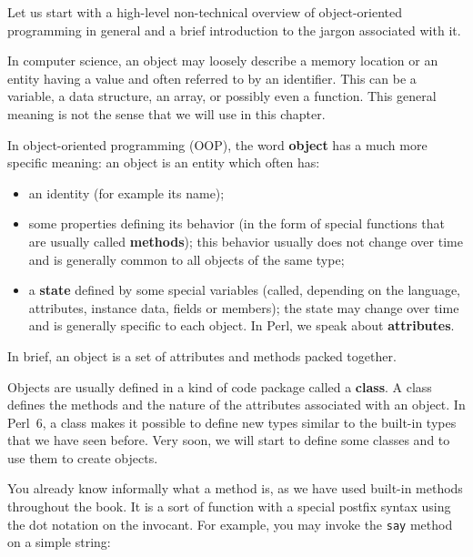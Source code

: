 Let us start with a high-level non-technical overview 
of object-oriented programming in general and a brief 
introduction to the jargon associated with it.

In computer science, an object may loosely describe a memory 
location or an entity having a value and often referred to 
by an identifier. This can be a variable, a data structure, 
an array, or possibly even a function. This general meaning 
is not the sense that we will use in this chapter.

In object-oriented programming (OOP), the word {\bf object} 
has a much more specific meaning: an object is an entity 
which often has:
\begin{itemize}

\item an identity (for example its name);

\item some properties defining its behavior (in the form of 
special functions that are usually called {\bf methods}); this 
behavior usually does not change over time and is generally 
common to all objects of the same type;

\item a {\bf state} defined by some special variables (called, 
depending on the language, attributes, instance data, fields 
or members); the state may change over time and is generally 
specific to each object. In Perl, we speak about 
{\bf attributes}.
\end{itemize}

In brief, an object is a set of attributes and methods packed 
together.

Objects are usually defined in a kind of code package called 
a {\bf class}. A class defines the methods and the nature of 
the attributes associated with an object. In Perl~6, a class makes it 
possible to define new types similar to the built-in types 
that we have seen before. Very soon, we will start to define 
some classes and to use them to create objects.

You already know informally what a method is, as we have 
used built-in methods throughout the book. It is a sort of 
function with a special postfix syntax using the dot notation 
on the invocant. For example, you may invoke the {\tt say} 
method on a simple string:

